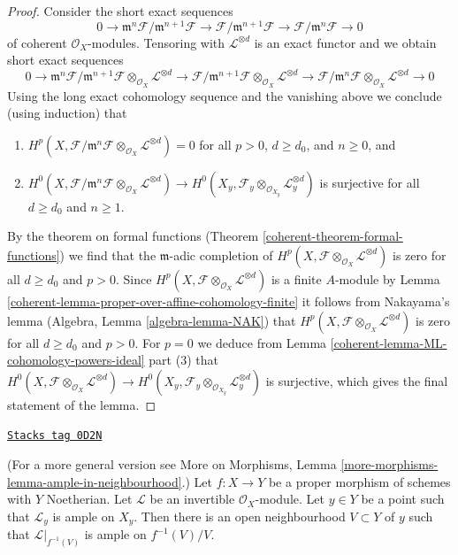 \begin{proof}
\medskip\noindent
Consider the short exact sequences
$$
0 \to \mathfrak m^n\mathcal{F}/\mathfrak m^{n + 1} \mathcal{F}
\to \mathcal{F}/\mathfrak m^{n + 1} \mathcal{F}
\to \mathcal{F}/\mathfrak m^n \mathcal{F} \to 0
$$
of coherent $\mathcal{O}_X$-modules. Tensoring with $\mathcal{L}^{\otimes d}$
is an exact functor and we obtain short exact sequences
$$
0 \to
\mathfrak m^n\mathcal{F}/\mathfrak m^{n + 1} \mathcal{F}
\otimes_{\mathcal{O}_X} \mathcal{L}^{\otimes d}
\to \mathcal{F}/\mathfrak m^{n + 1} \mathcal{F}
\otimes_{\mathcal{O}_X} \mathcal{L}^{\otimes d}
\to \mathcal{F}/\mathfrak m^n \mathcal{F}
\otimes_{\mathcal{O}_X} \mathcal{L}^{\otimes d} \to 0
$$
Using the long exact cohomology sequence and the vanishing above
we conclude (using induction) that
\begin{enumerate}
\item $H^p(X, \mathcal{F}/\mathfrak m^n \mathcal{F}
\otimes_{\mathcal{O}_X} \mathcal{L}^{\otimes d}) = 0$
for all $p > 0$, $d \geq d_0$, and $n \geq 0$, and
\item $H^0(X, \mathcal{F}/\mathfrak m^n \mathcal{F}
\otimes_{\mathcal{O}_X} \mathcal{L}^{\otimes d}) \to
H^0(X_y, \mathcal{F}_y \otimes_{\mathcal{O}_{X_y}} \mathcal{L}_y^{\otimes d})$
is surjective for all $d \geq d_0$ and $n \geq 1$.
\end{enumerate}
By the theorem on formal functions (Theorem \ref{coherent-theorem-formal-functions})
we find that the $\mathfrak m$-adic completion of
$H^p(X, \mathcal{F} \otimes_{\mathcal{O}_X} \mathcal{L}^{\otimes d})$
is zero for all $d \geq d_0$ and $p > 0$.
Since $H^p(X, \mathcal{F} \otimes_{\mathcal{O}_X} \mathcal{L}^{\otimes d})$
is a finite $A$-module by
Lemma \ref{coherent-lemma-proper-over-affine-cohomology-finite}
it follows from Nakayama's lemma (Algebra, Lemma \ref{algebra-lemma-NAK})
that $H^p(X, \mathcal{F} \otimes_{\mathcal{O}_X} \mathcal{L}^{\otimes d})$
is zero for all $d \geq d_0$ and $p > 0$.
For $p = 0$ we deduce from
Lemma \ref{coherent-lemma-ML-cohomology-powers-ideal} part (3)
that $H^0(X, \mathcal{F} \otimes_{\mathcal{O}_X} \mathcal{L}^{\otimes d}) \to
H^0(X_y, \mathcal{F}_y \otimes_{\mathcal{O}_{X_y}} \mathcal{L}_y^{\otimes d})$
is surjective, which gives the final statement of the lemma.
\end{proof}

\begin{lemma}
\label{coherent-lemma-ample-in-neighbourhood}
\href{https://stacks.math.columbia.edu/tag/0D2N}{\texttt{Stacks tag 0D2N}}

(For a more general version see
More on Morphisms,
Lemma \ref{more-morphisms-lemma-ample-in-neighbourhood}.)
Let $f : X \to Y$ be a proper morphism of schemes with $Y$ Noetherian.
Let $\mathcal{L}$ be an invertible $\mathcal{O}_X$-module.
Let $y \in Y$ be a point such that $\mathcal{L}_y$ is ample
on $X_y$. Then there is an open neighbourhood $V \subset Y$
of $y$ such that $\mathcal{L}|_{f^{-1}(V)}$ is ample on $f^{-1}(V)/V$.
\end{lemma}

